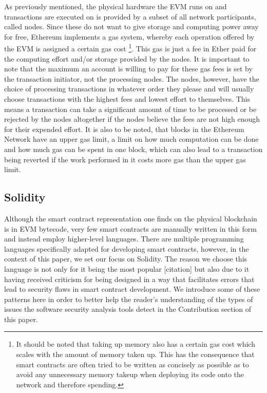 \documentclass[letterpaper,twocolumn,10pt]{article}
\begin{document}
As previously mentioned, the physical hardware the EVM runs on and transactions are executed on is provided by a subset of all network participants, called nodes. Since these do not want to give storage and computing power away for free, Ethereum implements a gas system, whereby each operation offered by the EVM is assigned a certain gas cost \footnote{It should be noted that taking up memory also has a certain gas cost which scales with the amount of memory taken up. This has the consequence that smart contracts are often tried to be written as concisely as possible as to avoid any unnecessary memory takeup when deploying its code onto the network and therefore spending.}. This gas is just a fee in Ether paid for the computing effort and/or storage provided by the nodes. It is important to note that the maximum an account is willing to pay for these gas fees is set by the transaction initiator, not the processing nodes. The nodes, however, have the choice of processing transactions in whatever order they please and will usually choose transactions with the highest fees and lowest effort to themselves. This means a transaction can take a significant amount of time to be processed or be rejected by the nodes altogether if the nodes believe the fees are not high enough for their expended effort. It is also to be noted, that blocks in the Ethereum Network have an upper gas limit, a limit on how much computation can be done and how much gas can be spent in one block, which can also lead to a transaction being reverted if the work performed in it costs more gas than the upper gas limit.

\subsection{Solidity}
\label{subsection:sol}
Although the smart contract representation one finds on the physical blockchain is in EVM bytecode, very few smart contracts are manually written in this form and instead employ higher-level languages. There are multiple programming languages specifically adapted for developing smart contracts, however, in the context of this paper, we set our focus on Solidity. The reason we choose this language is not only for it being the most popular [citation] but also due to it having received criticism for being designed in a way that facilitates errors that lead to security flaws in smart contract development. We introduce some of these patterns here in order to better help the reader's understanding of the types of issues the software security analysis tools detect in the Contribution section of this paper.
\end{document}
